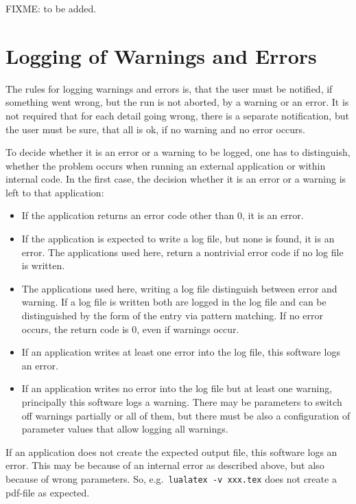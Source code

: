 \documentclass[12pt]{book}
\begin{document}
  



FIXME\@: to be added. 


\section{Logging of Warnings and Errors}\label{sec:logWarnErr}

The rules for logging warnings and errors is, 
that the user must be notified, 
if something went wrong, but the run is not aborted, 
by a warning or an error. 
It is not required that for each detail going wrong, 
there is a separate notification, 
but the user must be sure, that all is ok, 
if no warning and no error occurs. 

To decide whether it is an error or a warning to be logged, 
one has to distinguish, 
whether the problem occurs when running an external application 
or within internal code. 
In the first case, the decision whether it is an error or a warning 
is left to that application: 
%
\begin{itemize}
\item 
If the application returns an error code other than 0, 
it is an error. 
\item
If the application is expected to write a log file, 
but none is found, it is an error. 
The applications used here, 
return a nontrivial error code if no log file is written. 
\item
The applications used here, writing a log file 
distinguish between error and warning. 
If a log file is written both are logged in the log file 
and can be distinguished by the form of the entry via pattern matching. 
If no error occurs, the return code is 0, even if warnings occur. 
\item
If an application writes at least one error into the log file, 
this software logs an error. 
\item
If an application writes no error into the log file 
but at least one warning, principally this software logs a warning. 
There may be parameters to switch off warnings partially 
or all of them, 
but there must be also a configuration of parameter values 
that allow logging all warnings. 
\end{itemize}

If an application does not create the expected output file, 
this software logs an error. 
This may be because of an internal error as described above, 
but also because of wrong parameters. 
So, 
e.g.~\texttt{lualatex -v xxx.tex} 
does not create a pdf-file as expected. 
\end{document}
